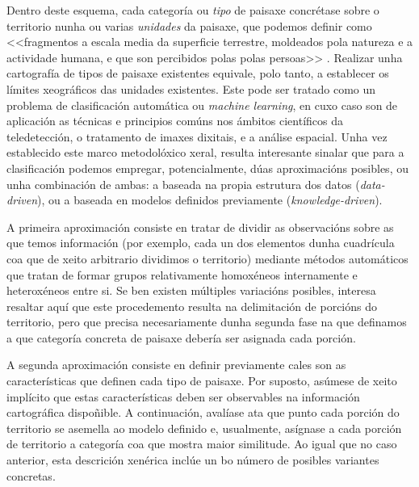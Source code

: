 \documentclass[11pt,a4paper]{article}
\begin{document}
Dentro deste esquema, cada categoría ou \emph{tipo} de paisaxe concrétase sobre o territorio nunha ou varias \emph{unidades} da paisaxe, que podemos definir como <<fragmentos a escala media da superficie terrestre, moldeados pola natureza e a actividade humana, e que son percibidos polas polas persoas>> \citep{Kienast2015136}. Realizar unha cartografía de tipos de paisaxe existentes equivale, polo tanto, a establecer os límites xeográficos das unidades existentes. Este pode ser tratado como un problema de clasificación automática ou \emph{machine learning}, en cuxo caso son de aplicación as técnicas e principios comúns nos ámbitos científicos da teledetección, o tratamento de imaxes dixitais, e a análise espacial. Unha vez establecido este marco metodolóxico xeral, resulta interesante sinalar que para a clasificación podemos empregar, potencialmente, dúas aproximacións posibles, ou unha combinación de ambas: a baseada na propia estrutura dos datos (\emph{data-driven}), ou a baseada en modelos definidos previamente (\emph{knowledge-driven}).

A primeira aproximación consiste en tratar de dividir as observacións sobre as que temos información (por exemplo, cada un dos elementos dunha cuadrícula coa que de xeito arbitrario dividimos o territorio) mediante métodos automáticos que tratan de formar grupos relativamente homoxéneos internamente e heteroxéneos entre si. Se ben existen múltiples variacións posibles, interesa resaltar aquí que este procedemento resulta na delimitación de porcións do territorio, pero que precisa necesariamente dunha segunda fase na que definamos a que categoría concreta de paisaxe debería ser asignada cada porción. 

A segunda aproximación consiste en definir previamente cales son as características que definen cada tipo de paisaxe. Por suposto, asúmese de xeito implícito que estas características deben ser observables na información cartográfica dispoñible. A continuación, avalíase ata que punto cada porción do territorio se asemella ao modelo definido e, usualmente, asígnase a cada porción de territorio a categoría coa que mostra maior similitude. Ao igual que no caso anterior, esta descrición xenérica inclúe un bo número de posibles variantes concretas.
\end{document}
